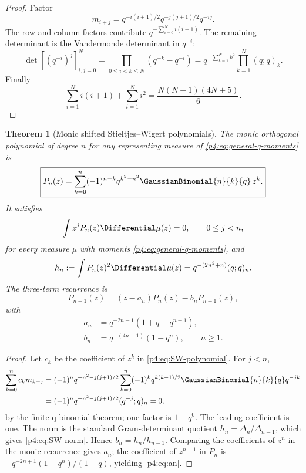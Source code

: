 \documentclass[11pt,oneside]{article}
\newtheorem{theorem}{Theorem}[section]
\theoremstyle{definition}
\theoremstyle{remark}
\begin{document}
\begin{proof}
Factor
\[
 m_{i+j}=q^{-i(i+1)/2}q^{-j(j+1)/2}q^{-ij}.
\]
The row and column factors contribute
$q^{-\sum_{i=0}^N i(i+1)}$.  The remaining determinant is the Vandermonde determinant in
$q^{-i}$:
\[
 \det[(q^{-i})^j]_{i,j=0}^N
 =\prod_{0\leq i<k\leq N}(q^{-k}-q^{-i})
 =q^{-\sum_{k=1}^Nk^2}\prod_{k=1}^{N}(q;q)_k.
\]
Finally
\[
 \sum_{i=1}^{N}i(i+1)+\sum_{i=1}^{N}i^2
 =\frac{N(N+1)(4N+5)}6.
\]
\end{proof}

\begin{theorem}[Monic shifted Stieltjes--Wigert polynomials]
\label{p4:thm:SW-polynomials}
The monic orthogonal polynomial of degree $n$ for any representing measure of
\eqref{p4:eq:general-q-moments} is
\begin{equation}
 \boxed{
 P_n(z)=\sum_{k=0}^{n}
 (-1)^{n-k}q^{k^2-n^2}\GaussianBinomial{n}{k}{q}\,z^k.}
 \label{p4:eq:SW-polynomial}
\end{equation}
It satisfies
\begin{equation}
 \int z^jP_n(z)\Differential\mu(z)=0,
 \qquad0\leq j<n,
 \label{p4:eq:SW-orthogonality}
\end{equation}
for every measure $\mu$ with moments \eqref{p4:eq:general-q-moments}, and
\begin{equation}
 h_n:=\int P_n(z)^2\Differential\mu(z)
 =q^{-(2n^2+n)}(q;q)_n.
 \label{p4:eq:SW-norm}
\end{equation}
The three-term recurrence is
\begin{equation}
 P_{n+1}(z)=(z-a_n)P_n(z)-b_nP_{n-1}(z),
 \label{p4:eq:SW-recurrence}
\end{equation}
with
\begin{align}
 a_n&=q^{-2n-1}(1+q-q^{n+1}),\label{p4:eq:an}\\
 b_n&=q^{-(4n-1)}(1-q^n),\qquad n\geq1.
 \label{p4:eq:bn}
\end{align}
\end{theorem}

\begin{proof}
Let $c_k$ be the coefficient of $z^k$ in \eqref{p4:eq:SW-polynomial}.  For $j<n$,
\begin{align*}
 \sum_{k=0}^{n}c_km_{k+j}
 &=(-1)^nq^{-n^2-j(j+1)/2}
 \sum_{k=0}^{n}(-1)^kq^{k(k-1)/2}
 \GaussianBinomial{n}{k}{q}q^{-jk}\\
 &=(-1)^nq^{-n^2-j(j+1)/2}(q^{-j};q)_n=0,
\end{align*}
by the finite q-binomial theorem; one factor is $1-q^0$.  The leading coefficient is one.
The norm is the standard Gram-determinant quotient
$h_n=\Delta_n/\Delta_{n-1}$, which gives \eqref{p4:eq:SW-norm}.  Hence
$b_n=h_n/h_{n-1}$.  Comparing the coefficients of $z^n$ in the monic recurrence gives
$a_n$; the coefficient of $z^{n-1}$ in $P_n$ is
$-q^{-2n+1}(1-q^n)/(1-q)$, yielding \eqref{p4:eq:an}.
\end{proof}
\end{document}
